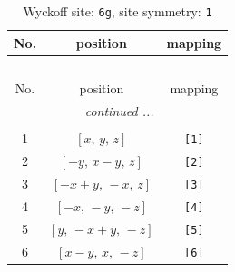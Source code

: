 \documentclass[fleqn,8pt]{jsarticle}
\begin{document}
\begin{longtable}{ccc}
\caption{Wyckoff site: {\tt 6g}, site symmetry: {\tt 1}}
 \\
 \hline \hline
No. & position & mapping \\ \hline \endfirsthead

\multicolumn{2}{l}{\tablename\ \thetable{}} \\
 \hline \hline
No. & position & mapping \\ \hline \endhead

 \hline \hline
\multicolumn{2}{r}{\footnotesize\it continued ...} \\ \endfoot

 \hline \hline
\multicolumn{2}{r}{} \\ \endlastfoot

1 & $\left[ x,\, y,\, z \right]$ & {\tt [1]} \\ \hline
2 & $\left[ - y,\, x - y,\, z \right]$ & {\tt [2]} \\ \hline
3 & $\left[ - x + y,\, - x,\, z \right]$ & {\tt [3]} \\ \hline
4 & $\left[ - x,\, - y,\, - z \right]$ & {\tt [4]} \\ \hline
5 & $\left[ y,\, - x + y,\, - z \right]$ & {\tt [5]} \\ \hline
6 & $\left[ x - y,\, x,\, - z \right]$ & {\tt [6]} \\
\end{longtable}
\end{document}
